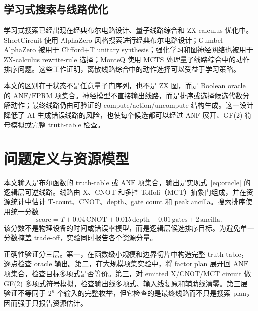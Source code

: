 \documentclass[UTF8,fontset=macnew,11pt]{ctexart}
\newcommand{\anf}{\ensuremath{\mathrm{ANF}}}
\newcommand{\fprm}{\ensuremath{\mathrm{FPRM}}}
\newcommand{\mcts}{\ensuremath{\mathrm{MCTS}}}
\newcommand{\score}{\ensuremath{\mathrm{score}}}
\newcommand{\ttable}{truth-table}
\newcommand{\mct}{\ensuremath{\mathrm{MCT}}}
\begin{document}
\subsection{学习式搜索与线路优化}

学习式搜索已经出现在经典布尔电路设计、量子线路综合和 ZX-calculus 优化中。ShortCircuit 使用 AlphaZero 风格搜索进行经典布尔电路设计\cite{tsaras2024shortcircuit}；Gumbel AlphaZero 被用于 Clifford+T unitary synthesis\cite{rietsch2024unitary}；强化学习和图神经网络也被用于 ZX-calculus rewrite-rule 选择\cite{riu2025rlzx}；MonteQ 使用 \mcts{} 处理量子线路综合中的动作排序问题\cite{machiya2026monteq}。这些工作证明，离散线路综合中的动作选择可以受益于学习策略。

本文的区别在于状态不是任意量子门序列，也不是 ZX 图，而是 Boolean oracle 的 \anf{}/\fprm{} 项集合。神经模型不直接输出线路，而是排序或选择候选代数分解动作；最终线路仍由可验证的 compute/action/uncompute 结构生成。这一设计降低了 AI 生成错误线路的风险，也使每个候选都可以经过 \anf{} 展开、GF(2) 符号模拟或完整 \ttable{} 检查。

\section{问题定义与资源模型}

本文输入是布尔函数的 \ttable{} 或 \anf{} 项集合，输出是实现式~\eqref{eq:oracle} 的逻辑层可逆线路。线路由 X、CNOT 和多控 Toffoli（\mct{}）抽象门组成，并在资源统计中估计 T-count、CNOT、depth、gate count 和 peak ancilla。搜索排序使用统一分数
\begin{equation}
  \score = T + 0.04\,\mathrm{CNOT} + 0.015\,\mathrm{depth}
         + 0.01\,\mathrm{gates} + 2\,\mathrm{ancilla}.
  \label{eq:score}
\end{equation}
该分数不是物理设备的时间或错误率模型，而是逻辑层候选排序目标。为避免单一分数掩盖 trade-off，实验同时报告各个资源分量。

正确性验证分三层。第一，在函数级小规模和边界切片中构造完整 \ttable{}，逐点检查 oracle 输出。第二，在大规模项集实验中，将 factor plan 展开回 \anf{} 项集合，检查目标多项式是否等价。第三，对 emitted X/CNOT/\mct{} circuit 做 GF(2) 多项式符号模拟，检查输出线多项式、输入线复原和辅助线清零。第三层验证不等同于 $2^n$ 个输入的完整枚举，但它检查的是最终线路而不只是搜索 plan，因而强于只报告资源估计。
\end{document}
